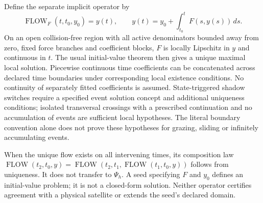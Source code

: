 Define the separate implicit operator by
\begin{equation}
 \operatorname{FLOW}_F(t,t_0,y_0)=y(t),\qquad
 y(t)=y_0+\int_{t_0}^{t}F(s,y(s))\,ds .
\end{equation}
On an open collision-free region with all active denominators bounded away
from zero, fixed force branches and coefficient blocks, $F$ is locally Lipschitz
in $y$ and continuous in $t$. The usual initial-value theorem then gives a
unique maximal local solution. Piecewise continuous time coefficients can be
concatenated across declared time boundaries under corresponding local
existence conditions. No continuity of separately fitted coefficients is
assumed. State-triggered shadow switches require a specified event solution
concept and additional uniqueness conditions; isolated transversal crossings
with a prescribed continuation and no accumulation of events are sufficient
local hypotheses. The literal boundary convention alone does not prove these
hypotheses for grazing, sliding or infinitely accumulating events.

When the unique flow exists on all intervening times, its composition law
$\operatorname{FLOW}(t_2,t_0,y)=\operatorname{FLOW}(t_2,t_1,
\operatorname{FLOW}(t_1,t_0,y))$ follows from uniqueness. It does not transfer to
$\Psi_h$. A seed specifying $F$ and $y_0$ defines an initial-value problem; it
is not a closed-form solution. Neither operator certifies agreement with a
physical satellite or extends the seed's declared domain.

